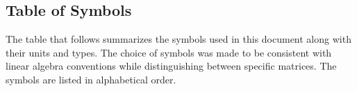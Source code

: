 \documentclass[12pt]{article}
\begin{document}

\subsection{Table of Symbols} \label{sec_tabSymbs}

The table that follows summarizes the symbols used in this document along with
their units and types. The choice of symbols was made to be consistent with
linear algebra conventions while distinguishing between specific matrices.  The
symbols are listed in alphabetical order.

\end{document}
